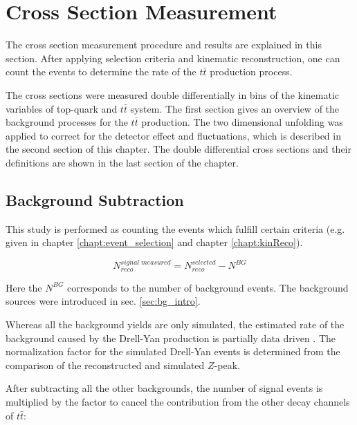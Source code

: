 \chapter{Cross Section Measurement}\label{chapt:xsec}

The cross section measurement procedure and results are explained in this section.
After applying selection criteria and kinematic reconstruction, one can count the events to determine
the rate of the $t\bar{t}$ production process.

The cross sections were measured double differentially in bins of the kinematic variables of top-quark and $t\bar{t}$ system.
The first section gives an overview of the background processes for the $t\bar{t}$ production.
The two dimensional unfolding was applied to correct for the detector effect and fluctuations, which is described
in the second section of this chapter.
The double differential cross sections and their definitions are shown in the last section of the chapter.

\section{Background Subtraction}
This study is performed as counting the events which fulfill certain criteria (e.g. given in chapter \ref{chapt:event_selection} and 
chapter \ref{chapt:kinReco}). 

\begin{equation}\label{eq:bgsub}
 N^{signal\;measured}_{reco} = N^{selected}_{reco} - N^{BG}
\end{equation}

Here the $N^{BG}$ corresponds to the number of background events. The background sources were introduced in sec. \ref{sec:bg_intro}.

Whereas all the background yields are only simulated, the estimated rate of the background caused by the Drell-Yan production is 
partially data driven \cite{Chatrchyan:2011nb}. The normalization factor for the simulated Drell-Yan events is determined 
from the comparison of the reconstructed and simulated $Z$-peak. 

After subtracting all the other backgrounds, the number of signal events is multiplied by the factor to cancel the contribution
from the other decay channels of $t\bar{t}$:

